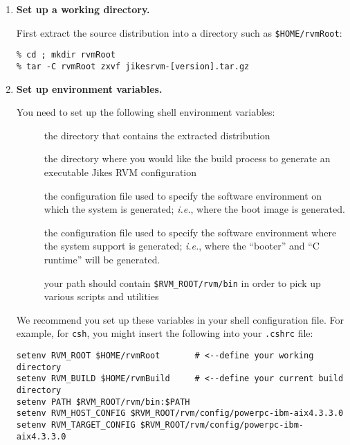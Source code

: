 \begin{enumerate}
\item {\bf Set up a working directory.}

First extract the \jrvm{} source distribution into a
directory such as  
\texttt{\$HOME/rvmRoot}:
\begin{verbatim}
% cd ; mkdir rvmRoot
% tar -C rvmRoot zxvf jikesrvm-[version].tar.gz 
\end{verbatim}

%
\item {\bf Set up environment variables.}

You need to set up the following shell environment variables:

\begin{description}

\item[] the directory that contains
  the extracted distribution

\item[]
the directory where you would like the build
process to generate an executable Jikes RVM configuration

\item[]
the configuration file used to specify
the software environment on which the system is generated; {\it i.e.}, where the
boot image is generated.  

\item[] the
configuration file used to specify the software environment where the
system support is generated; {\it i.e.}, where the ``booter'' and ``C
runtime'' will be generated. 

\item[] your path should contain \texttt{\$RVM\_\-ROOT/\-rvm/\-bin} in
order to pick up various scripts and utilities

\end{description}

We recommend you set up these variables in your shell configuration
file.  For example, for \texttt{csh}, you might insert the
following into your \texttt{.cshrc} file:

\begin{verbatim}
setenv RVM_ROOT $HOME/rvmRoot       # <--define your working directory 
setenv RVM_BUILD $HOME/rvmBuild     # <--define your current build directory 
setenv PATH $RVM_ROOT/rvm/bin:$PATH
setenv RVM_HOST_CONFIG $RVM_ROOT/rvm/config/powerpc-ibm-aix4.3.3.0
setenv RVM_TARGET_CONFIG $RVM_ROOT/rvm/config/powerpc-ibm-aix4.3.3.0
\end{verbatim}


\end{enumerate}

